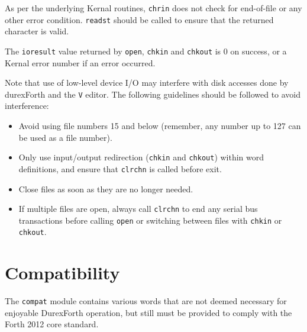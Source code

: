 As per the underlying Kernal routines, \texttt{chrin} does not check for end-of-file or any other error condition. \texttt{readst} should be called to ensure that the returned character is valid.

The \texttt{ioresult} value returned by \texttt{open}, \texttt{chkin} and \texttt{chkout} is 0 on success, or a Kernal error number if an error occurred.

Note that use of low-level device I/O may interfere with disk accesses done by durexForth and the \texttt{V} editor. The following guidelines should be followed to avoid interference:

\begin{itemize}
    \item Avoid using file numbers 15 and below (remember, any number up to 127 can be used as a file number).
    \item Only use input/output redirection (\texttt{chkin} and \texttt{chkout}) within word definitions, and ensure that \texttt{clrchn} is called before exit.
    \item Close files as soon as they are no longer needed.
    \item If multiple files are open, always call \texttt{clrchn} to end any serial bus transactions before calling \texttt{open} or switching between files with \texttt{chkin} or \texttt{chkout}.
\end{itemize}

\section{Compatibility}

The \texttt{compat} module contains various words that are not deemed necessary for enjoyable DurexForth operation, but still must be provided to comply with the Forth 2012 core standard.

